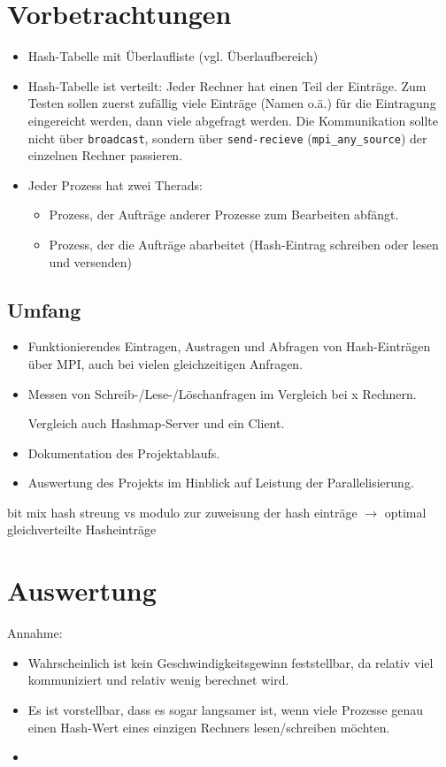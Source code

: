 \documentclass{scrreprt}
\begin{document}
\chapter{Vorbetrachtungen}

\begin{itemize}
\item Hash-Tabelle mit Überlaufliste (vgl. Überlaufbereich)
\item Hash-Tabelle ist verteilt: Jeder Rechner hat einen Teil der Einträge. Zum Testen sollen zuerst zufällig viele Einträge (Namen o.ä.) für die Eintragung eingereicht werden, dann viele abgefragt werden. Die Kommunikation sollte nicht über \lstinline`broadcast`, sondern über \lstinline`send-recieve` (\lstinline`mpi_any_source`) der einzelnen Rechner passieren.
\item Jeder Prozess hat zwei Therads: 
\begin{itemize}
\item Prozess, der Aufträge anderer Prozesse zum Bearbeiten abfängt.
\item Prozess, der die Aufträge abarbeitet (Hash-Eintrag schreiben oder lesen und versenden)
\end{itemize}
\end{itemize}

\section{Umfang}
\begin{itemize}
\item Funktionierendes Eintragen, Austragen und Abfragen von Hash-Einträgen über MPI, auch bei vielen gleichzeitigen Anfragen.
\item Messen von Schreib-/Lese-/Löschanfragen im Vergleich bei x Rechnern.%

Vergleich auch Hashmap-Server und ein Client.
\item Dokumentation des Projektablaufs.
\item Auswertung des Projekts im Hinblick auf Leistung der Parallelisierung.
\end{itemize}

bit mix hash streung vs modulo zur zuweisung der hash einträge $\to$ optimal gleichverteilte Hasheinträge

\chapter{Auswertung}

Annahme:
\begin{itemize}
\item Wahrscheinlich ist kein Geschwindigkeitsgewinn feststellbar, da relativ viel kommuniziert und relativ wenig berechnet wird.
\item Es ist vorstellbar, dass es sogar langsamer ist, wenn viele Prozesse genau einen Hash-Wert eines einzigen Rechners lesen/schreiben möchten.
\item 
\end{itemize}

\end{document}
